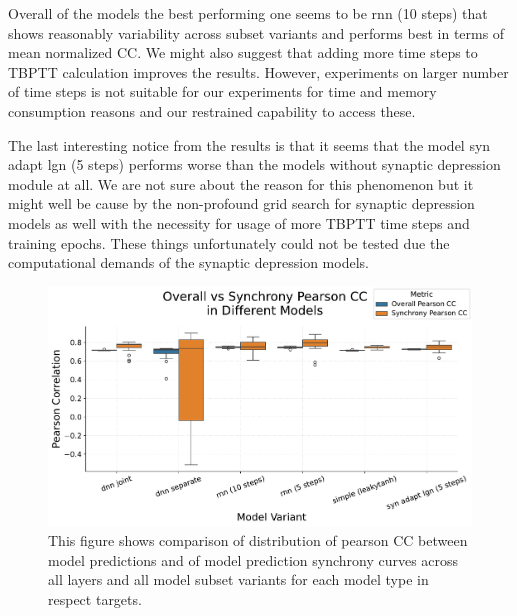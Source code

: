 Overall of the models the best performing one seems to be rnn (10 steps) that shows reasonably variability across subset variants and performs best in terms of mean normalized CC. We might also suggest that adding more time steps to TBPTT calculation improves the results. However, experiments on larger number of time steps is not suitable for our experiments for time and memory consumption reasons and our restrained capability to access these.

The last interesting notice from the results is that it seems that the model syn adapt lgn (5 steps) performs worse than the models without synaptic depression module at all. We are not sure about the reason for this phenomenon but it might well be cause by the non-profound grid search for synaptic depression models as well with the necessity for usage of more TBPTT time steps and training epochs. These things unfortunately could not be tested due the computational demands of the synaptic depression models.

\begin{figure}
    \centering
    \includegraphics[width=\linewidth]{img/plots/boxplot_model_comparison_synchrony_overall_pearson.pdf}
    \caption{This figure shows comparison of distribution of pearson CC between model predictions and of model prediction synchrony curves across all layers and all model subset variants for each model type in respect targets.}
    \label{fig:boxplot_models_overall_synchrony_pearson_comparison}
\end{figure}


